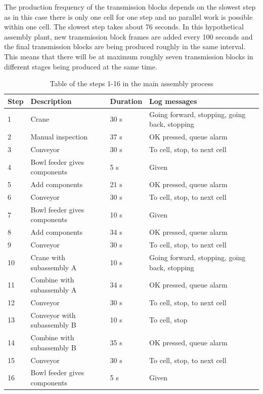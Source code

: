 \documentclass[journal]{IEEEtran}
\begin{document}
The production frequency of the transmission blocks depends on the slowest step as in this case there is only one cell for one step and no
parallel work is possible within one cell. The slowest step takes about 76 seconds. In this hypothetical assembly plant, new transmission block
frames are added every 100 seconds and the final transmission blocks are being produced roughly in the same interval. This means that there
will be at maximum roughly seven transmission blocks in different stages being produced at the same time.

\begin{table}[!t]
\renewcommand{\arraystretch}{1.3}
\caption{Table of the steps 1-16 in the main assembly process}
\label{mainsteps1}
\centering
\begin{tabular}{|p{5mm}|p{20mm}|p{10mm}|p{15mm}|p{15mm}|}
\hline
Step & Description & Duration & Log messages \\
\hline
\hline
1 & Crane & 30 s & Going forward, stopping, going back, stopping \\
\hline
2 & Manual inspection & 37 s & OK pressed, queue alarm \\
\hline
3 & Conveyor & 30 s & To cell, stop, to next cell \\
\hline
4 & Bowl feeder gives components & 5 s & Given \\
\hline
5 & Add components & 21 s & OK pressed, queue alarm \\
\hline
6 & Conveyor & 30 s & To cell, stop, to next cell \\
\hline
7 & Bowl feeder gives components & 10 s & Given \\
\hline
8 & Add components & 34 s & OK pressed, queue alarm \\
\hline
9 & Conveyor & 30 s & To cell, stop, to next cell \\
\hline
10 & Crane with subassembly A & 10 s & Going forward, stopping, going back, stopping \\
\hline
11 & Combine with subassembly A & 34 s & OK pressed, queue alarm \\
\hline
12 & Conveyor & 30 s & To cell, stop, to next cell \\
\hline
13 & Conveyor with subassembly B & 10 s & To cell, stop \\
\hline
14 & Combine with subassembly B & 35 s & OK pressed, queue alarm \\
\hline
15 & Conveyor & 30 s & To cell, stop, to next cell \\
\hline
16 & Bowl feeder gives components & 5 s & Given \\
\hline
\end{tabular}
\end{table}
\end{document}

